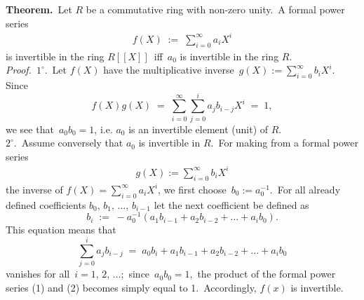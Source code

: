 \documentclass[12pt]{article}
\theoremstyle{definition}
\begin{document}
 

\textbf{Theorem.}\, Let $R$ be a commutative ring with non-zero unity.\, A formal power series 
\begin{align}
f(X) \;:=\; \sum_{i=0}^\infty a_iX^i
\end{align}
is invertible in the ring $R[[X]]$\, iff\, $a_0$ is invertible in the ring $R$.\\


\emph{Proof.}\, $1^\circ$.\, Let $f(X)$ have the multiplicative inverse \,$g(X) := \sum_{i=0}^\infty b_iX^i$.\, Since
$$f(X)g(X) \;=\; \sum_{i=0}^\infty\sum_{j=0}^ia_jb_{i-j}X^i \;=\; 1,$$ 
we see that\, $a_0b_0 = 1$, i.e. $a_0$ is an invertible element (unit) of $R$.\\

$2^\circ$.\, Assume conversely that $a_0$ is invertible in $R$.\, For making from a formal power series
\begin{align}
g(X) := \sum_{i=0}^\infty b_iX^i
\end{align}
the inverse of $f(X) = \sum_{i=0}^\infty a_iX^i$, we first choose\, $b_0 := a_0^{-1}$.\, For all already defined coefficients $b_0,\,b_1,\,\ldots,\,b_{i-1}$ let the next coefficient be defined as
$$b_i \;:=\; -a_0^{-1}(a_1b_{i-1}\!+\!a_2b_{i-2}\!+\ldots+\!a_ib_0).$$
This equation means that 
$$\sum_{j=0}^ia_jb_{i-j} \;=\; a_0b_i\!+\!a_1b_{i-1}\!+\!a_2b_{i-2}\!+\ldots+\!a_ib_0$$
vanishes for all\, $i = 1,\,2,\,\ldots$;\, since\, $a_0b_0 = 1$,\, the product of the formal power series (1) and (2) becomes simply equal to 1.\, Accordingly, $f(x)$ is invertible.
\end{document}
